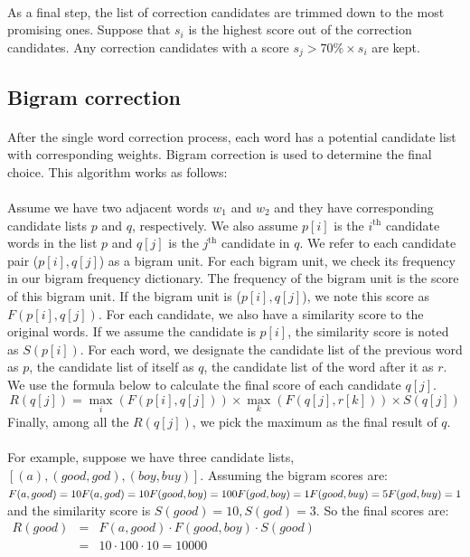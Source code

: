 \documentclass[twocolumn,10pt]{article}
\begin{document}
\paragraph{}As a final step, the list of correction candidates are trimmed down to the most promising ones. Suppose that $s_i$ is the highest score out of the correction candidates. Any correction candidates with a score $s_j > 70\% \times s_i$ are kept.
\subsection*{Bigram correction}
\paragraph{}After the single word correction process, each word has a potential candidate list with corresponding weights. Bigram correction is used to determine the final choice. This algorithm works as follows:
\paragraph{} Assume we have two adjacent words $w_1$ and $w_2$ and they have corresponding candidate lists $p$ and $q$, respectively. We also assume $p[i]$ is the $i^{\text{th}}$ candidate words in the list $p$ and $q[j]$ is the $j^{\text{th}}$ candidate in $q$. We refer to each candidate pair ($p[i], q[j]$) as a bigram unit. For each bigram unit, we check its frequency in our bigram frequency dictionary. The frequency of the bigram unit is the score of this bigram unit. If the bigram unit is ($p[i],q[j]$), we note this score as $F(p[i],q[j])$. For each candidate, we also have a similarity score to the original words. If we assume the candidate is $p[i]$, the similarity score is noted as $S(p[i])$. For each word, we designate the candidate list of the previous word as $p$, the candidate list of itself as $q$, the candidate list of the word after it as $r$. We use the formula below to calculate the final score of each candidate $q[j]$.
$$R(q[j]) = \max_i(F(p[i],q[j])) \times \max_k(F(q[j],r[k]))\times S(q[j])$$
Finally, among all the $R(q[j])$, we pick the maximum as the final result of $q$.
\paragraph{}For example, suppose we have three candidate lists, $[(a), (good, god), (boy, buy)]$. Assuming the bigram scores are:\\
$
F(a,good)=10\\
F(a, god)=10\\
F(good, boy)=100\\
F(god, boy)=1\\
F(good, buy)=5\\
F(god, buy)=1
$\\
and the similarity score is $S(good)=10, S(god)=3$. So the final scores are:\\
$\begin{array}{lcr}
R(good)&=&F(a,good)\cdot F(good,boy)\cdot S(good)\\
&=&10\cdot100\cdot10 = 10000\end{array}$\\
\end{document}
